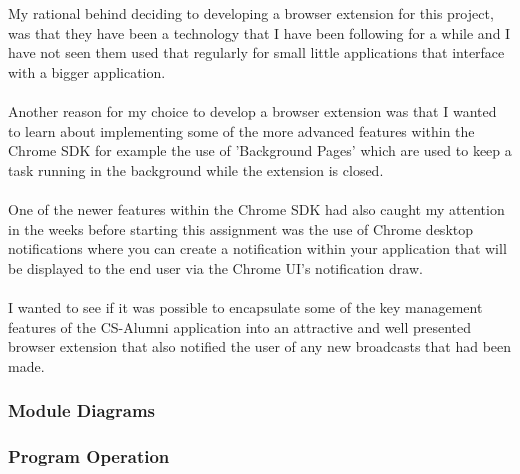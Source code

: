 \documentclass{article}
\begin{document}
My rational behind deciding to developing a browser extension for this project, was that they have been a technology that I have been following for a while and I have not seen them used that regularly for small little applications that interface with a bigger application.\\
\\
Another reason for my choice to develop a browser extension was that I wanted to learn about implementing some of the more advanced features within the Chrome SDK for example the use of 'Background Pages' which are used to keep a task running in the background while the extension is closed.\\
\\
One of the newer features within the Chrome SDK had also caught my attention in the weeks before starting this assignment was the use of Chrome desktop notifications where you can create a notification within your application that will be displayed to the end user via the Chrome UI's notification draw.\\
\\
I wanted to see if it was possible to encapsulate some of the key management features of the CS-Alumni application into an attractive and well presented browser extension that also notified the user of any new broadcasts that had been made.

\subsubsection{Module Diagrams}

\newpage
\subsubsection{Program Operation}
\end{document}

